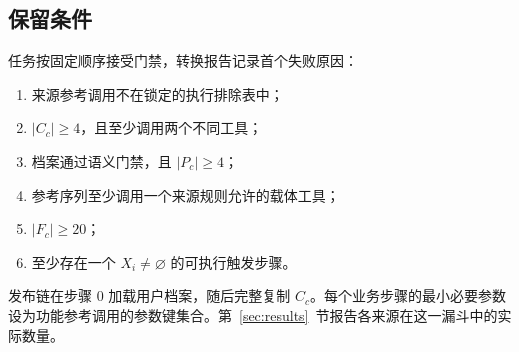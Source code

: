 \subsection{保留条件}

任务按固定顺序接受门禁，转换报告记录首个失败原因：

\begin{enumerate}
  \item 来源参考调用不在锁定的执行排除表中；
  \item $|C_c|\ge 4$，且至少调用两个不同工具；
  \item 档案通过语义门禁，且 $|P_c|\ge 4$；
  \item 参考序列至少调用一个来源规则允许的载体工具；
  \item $|F_c|\ge 20$；
  \item 至少存在一个 $X_i\ne\varnothing$ 的可执行触发步骤。
\end{enumerate}

发布链在步骤 0 加载用户档案，随后完整复制 $C_c$。每个业务步骤的最小必要参数设为功能参考调用的参数键集合。第~\ref{sec:results}~节报告各来源在这一漏斗中的实际数量。
